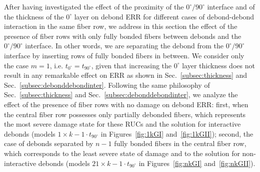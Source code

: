 \documentclass[review]{elsarticle}
\begin{document}
After having investigated the effect of the proximity of the $0^{\circ}/90^{\circ}$ interface and of the thickness of the $0^{\circ}$ layer on debond ERR for different cases of debond-debond interaction in the same fiber row, we address in this section the effect of the presence of fiber rows with only fully bonded fibers between debonds and the $0^{\circ}/90^{\circ}$ interface. In other words, we are separating the debond from the $0^{\circ}/90^{\circ}$ interface by inserting rows of fully bonded fibers in between. We consider only the case $m=1$, i.e. $t_{0^{\circ}}=t_{90^{\circ}}$, given that increasing the $0^{\circ}$ layer thickness does not result in any remarkable effect on ERR as shown in Sec.~\ref{subsec:thickness} and Sec.~\ref{subsec:debonddebondinter}. Following the same philosophy of Sec.~\ref{subsec:thickness} and Sec.~\ref{subsec:debonddebondinter}, we analyze the effect of the presence of fiber rows with no damage on debond ERR: first, when the central fiber row possesses only partially debonded fibers, which represents the most severe damage state for these RUCs and the solution for interactive debonds (models $1\times k-1\cdot t_{90^{\circ}}$ in Figures~\ref{fig:1kGI} and~\ref{fig:1kGII}); second, the case of debonds separated by $n-1$ fully bonded fibers in the central fiber row, which corresponds to the least severe state of damage and to the solution for non-interactive debonds (models $21\times k-1\cdot t_{90^{\circ}}$ in Figures~\ref{fig:nkGI} and~\ref{fig:nkGII}).\\%
\end{document}
